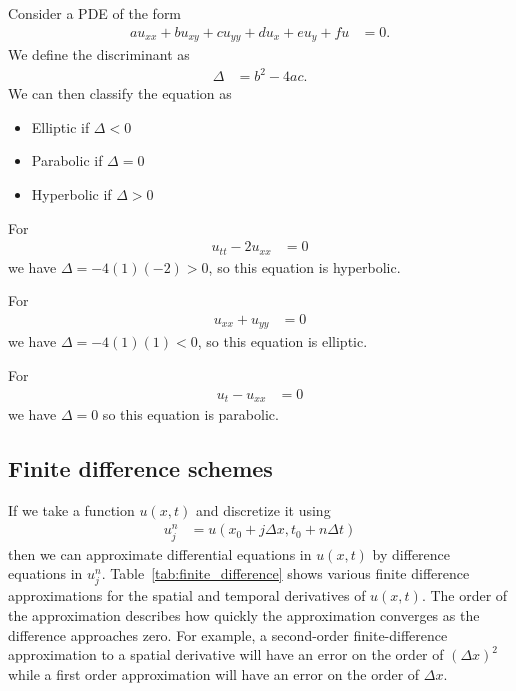 \documentclass[twocolumn]{myarticle}
\begin{document}
Consider a PDE of the form
\begin{align}
    a u_{xx} + b u_{xy} + c u_{yy} + d u_{x} + e u_{y} + fu &= 0.
\end{align}
We define the discriminant as
\begin{align}
    \Delta &= b^2 - 4 a c.
\end{align}
We can then classify the equation as
\begin{itemize}
\item
    Elliptic if $ \Delta < 0 $
\item
    Parabolic if $ \Delta = 0 $
\item
    Hyperbolic if $ \Delta > 0 $
\end{itemize}

For
\begin{align}
    u_{tt} - 2 u_{xx} &= 0
\end{align}
we have $ \Delta = - 4 (1) (-2) > 0 $, so this equation is hyperbolic.

For 
\begin{align}
    u_{xx} + u_{yy} &= 0
\end{align}
we have $ \Delta = -4 (1) (1) < 0 $, so this equation is elliptic.

For
\begin{align}
    u_t - u_{xx} &= 0
\end{align}
we have $ \Delta = 0 $ so this equation is parabolic.

\subsection{Finite difference schemes}
\label{subsec:finite_difference_schemes}

If we take a function $ u(x,t) $ and discretize it using
\begin{align}
    u^{n}_{j} &= u(x_0 + j \Delta x, t_0 + n \Delta t)
\end{align}
then we can approximate differential equations in $ u(x,t) $ by difference equations in $ u^n_j $.
Table~\ref{tab:finite_difference} shows various finite difference approximations for the spatial and temporal derivatives of $ u(x,t) $.
The order of the approximation describes how quickly the approximation converges as the difference approaches zero.
For example, a second-order finite-difference approximation to a spatial derivative will have an error on the order of $ (\Delta x)^2 $ while a first order approximation will have an error on the order of $ \Delta x $.
\end{document}
